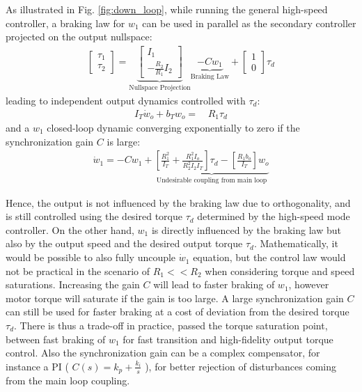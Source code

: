 As illustrated in Fig. \ref{fig:down_loop}, while running the general high-speed controller, a braking law for $w_1$ can be used in parallel as the secondary controller projected on the output nullspace:
\begin{align}
\left[ \begin{array}{c}
\tau_1 \\
\tau_2
\end{array} \right]
 = 
\underbrace{\left[ \begin{array}{c}
I_1 \\
-\frac{R_2 }{R_1 }  I_2
\end{array} \right]}_{\text{Nullspace Projection}} \underbrace{-C w_1}_{\text{Braking Law}} + 
\left[ \begin{array}{c}
1 \\
0 
\end{array} \right]  \tau_d
\label{eq:syncrhonization_ctl}
\end{align}
leading to independent output dynamics controlled with $\tau_d$:
\begin{align}
I_T \dot{w}_o +
b_T  w_o
=& \, R_1 \tau_d  
\end{align}
and a $w_1$ closed-loop dynamic converging exponentially to zero if the synchronization gain $C$ is large:
\begin{align}
 \dot{w}_1 = -C w_1 + \underbrace{\left[\frac{R_1^2}{I_T} + \frac{R_1^2 I_o}{R_2^2 I_2 I_T} \right] \tau_d - \left[\frac{R_1 b_o}{I_T}\right] w_o }_{\text{Undesirable coupling from main loop}}
\end{align}

Hence, the output is not influenced by the braking law due to orthogonality, and is still controlled using the desired torque $\tau_d$ determined by the high-speed mode controller. On the other hand, $w_1$ is directly influenced by the braking law but also by the output speed and the desired output torque $\tau_d$. Mathematically, it would be possible to also fully uncouple $\dot{w}_1$ equation, but the control law would not be practical in the scenario of $R_1<<R_2$ when considering torque and speed saturations. Increasing the gain $C$ will lead to faster braking of $w_1$, however motor torque will saturate if the gain is too large. A large synchronization gain $C$ can still be used for faster braking at a cost of deviation from the desired torque $\tau_d$. There is thus a trade-off in practice, passed the torque saturation point, between fast braking of $w_1$ for fast transition and high-fidelity output torque control. Also the synchronization gain can be a complex compensator, for instance a PI ( $C(s) = k_p + \frac{k_i}{s}$ ), for better rejection of disturbances coming from the main loop coupling. 




